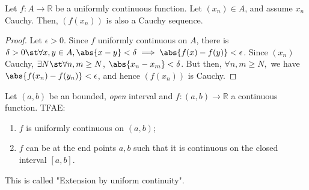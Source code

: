 \documentclass[12pt]{article}
\begin{document}
\begin{theorem}
  Let $f: A \to \mathbb{R}$ be a uniformly continuous function. Let $(x_n)\in A$, and assume $x_n$ Cauchy. Then, $(f(x_n))$ is also a Cauchy sequence.
\end{theorem}
\begin{proof}
  Let $\epsilon > 0$. Since $f$ uniformly continuous on $A$, there is $\delta > 0 \st \forall x,y \in A, \abs{x - y} < \delta \implies \abs{f(x) - f(y)} < \epsilon$. Since $(x_n)$ Cauchy, $\exists N \st \forall n, m \geq N$, $\abs{x_n - x_m} < \delta$. But then, $\forall n, m \geq N,$ we have $\abs{f(x_n) - f(y_n)} < \epsilon$, and hence $(f(x_n))$ is Cauchy.
\end{proof}

\begin{theorem}\label{thm:cauchysequenceimpliescauchyimage}
  Let $(a,b)$ be an bounded, \emph{open} interval and $f: (a,b) \to \mathbb{R}$ a continuous function. TFAE:
  \begin{enumerate}
    \item $f$ is uniformly continuous on $(a,b)$;
    \item $f$ can be at the end points $a,b$ such that it is continuous on the closed interval $[a,b]$.
  \end{enumerate}
\end{theorem}

\begin{remark}
  This is called "Extension by uniform continuity".
\end{remark}
\end{document}
